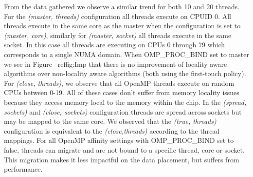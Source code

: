 From the data gathered we observe a similar trend for both 10 and 20 threads. 
For the \textit{(master, threads)} configuration all threads execute on CPUID 0. 
All threads execute in the same core as the master when the configuration is set to \textit{(master, core)}, similarly for \textit{(master, socket)} all threads execute in the same socket. In this case all threads are executing on CPUs 0 through 79 which corresponds to a single NUMA domain. When OMP\_PROC\_BIND set to master we see in Figure ~ref{fig:Imp} that there is no improvement of locality aware algorithms over non-locality aware algorithms (both using the first-touch policy).
For \textit{(close, threads)}, we observe that all OpenMP threads execute on random CPUs between 0-19. All of these cases don't suffer from memory locality issues because they access memory local to the memory within the chip.
In the \textit{(spread, sockets)} and \textit{(close, sockets)} configuration threads are spread across sockets but may be mapped to the same core. We observed that the \textit{(true, threads)} configuration is equivalent to the \textit{(close,threads)} according to the thread mappings.
For all OpenMP affinity settings  with OMP\_PROC\_BIND set to false, threads can migrate and are not bound to a specific thread, core or socket. This migration makes it less impactful on the data placement, but suffers from performance.